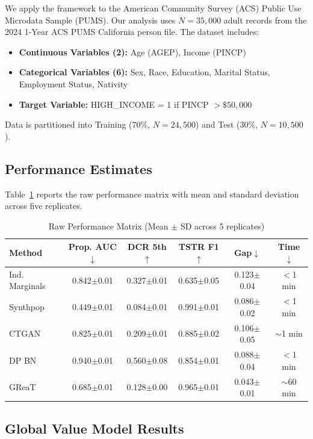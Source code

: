 \documentclass[12pt,a4paper]{article}
\begin{document}
We apply the framework to the American Community Survey (ACS) Public Use Microdata Sample (PUMS). Our analysis uses $N = 35{,}000$ adult records from the 2024 1-Year ACS PUMS California person file. The dataset includes:

\begin{itemize}
    \item \textbf{Continuous Variables (2):} Age (AGEP), Income (PINCP)
    \item \textbf{Categorical Variables (6):} Sex, Race, Education, Marital Status, Employment Status, Nativity
    \item \textbf{Target Variable:} HIGH\_INCOME = 1 if PINCP $> \$50{,}000$
\end{itemize}

Data is partitioned into Training (70\%, $N=24{,}500$) and Test (30\%, $N=10{,}500$).

\subsection{Performance Estimates}

Table~\ref{tab:performance} reports the raw performance matrix with mean and standard deviation across five replicates.

\begin{table}[htbp]
\centering
\caption{Raw Performance Matrix (Mean $\pm$ SD across 5 replicates)}
\label{tab:performance}
\begin{tabular}{@{}lccccc@{}}
\toprule
\textbf{Method} & \textbf{Prop. AUC}$\downarrow$ & \textbf{DCR 5th}$\uparrow$ & \textbf{TSTR F1}$\uparrow$ & \textbf{Gap}$\downarrow$ & \textbf{Time}$\downarrow$ \\
\midrule
Ind. Marginals & 0.842$\pm$0.01 & 0.327$\pm$0.01 & 0.635$\pm$0.05 & 0.123$\pm$0.04 & $<$1 min \\
Synthpop & 0.449$\pm$0.01 & 0.084$\pm$0.01 & 0.991$\pm$0.01 & 0.086$\pm$0.02 & $<$1 min \\
CTGAN & 0.825$\pm$0.01 & 0.209$\pm$0.01 & 0.885$\pm$0.02 & 0.106$\pm$0.05 & $\sim$1 min \\
DP BN & 0.940$\pm$0.01 & 0.560$\pm$0.08 & 0.854$\pm$0.01 & 0.088$\pm$0.04 & $<$1 min \\
GReaT & 0.685$\pm$0.01 & 0.128$\pm$0.00 & 0.965$\pm$0.01 & 0.043$\pm$0.01 & $\sim$60 min \\
\bottomrule
\end{tabular}
\end{table}

\subsection{Global Value Model Results}
\end{document}
